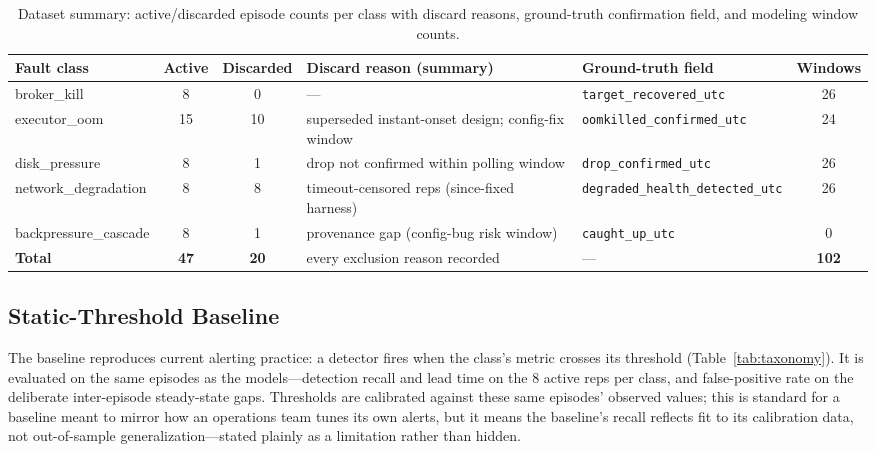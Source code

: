 \documentclass[conference]{IEEEtran}
\newcommand{\bk}{broker\_kill}
\newcommand{\eo}{executor\_oom}
\newcommand{\dpr}{disk\_pressure}
\newcommand{\nd}{network\_degradation}
\newcommand{\bc}{backpressure\_cascade}
\begin{document}
\begin{table}[!t]
\caption{Dataset summary: active/discarded episode counts per class with discard reasons, ground-truth confirmation field, and modeling window counts.}
\label{tab:dataset}
\centering
\footnotesize
\begin{tabular}{@{}lccllc@{}}
\toprule
\textbf{Fault class} & \textbf{Active} & \textbf{Discarded} & \textbf{Discard reason (summary)} & \textbf{Ground-truth field} & \textbf{Windows} \\
\midrule
\bk{}  & 8  & 0  & ---                                       & \texttt{target\_recovered\_utc}        & 26 \\
\eo{}  & 15 & 10 & superseded instant-onset design; config-fix window & \texttt{oomkilled\_confirmed\_utc} & 24 \\
\dpr{} & 8  & 1  & drop not confirmed within polling window   & \texttt{drop\_confirmed\_utc}          & 26 \\
\nd{}  & 8  & 8  & timeout-censored reps (since-fixed harness) & \texttt{degraded\_health\_detected\_utc} & 26 \\
\bc{}  & 8  & 1  & provenance gap (config-bug risk window)    & \texttt{caught\_up\_utc}               & 0 \\
\midrule
\textbf{Total} & \textbf{47} & \textbf{20} & every exclusion reason recorded & --- & \textbf{102} \\
\bottomrule
\end{tabular}
\end{table}

\subsection{Static-Threshold Baseline}
The baseline reproduces current alerting practice: a detector fires when the class's metric crosses its threshold (Table~\ref{tab:taxonomy}). It is evaluated on the same episodes as the models---detection recall and lead time on the 8 active reps per class, and false-positive rate on the deliberate inter-episode steady-state gaps. Thresholds are calibrated against these same episodes' observed values; this is standard for a baseline meant to mirror how an operations team tunes its own alerts, but it means the baseline's recall reflects fit to its calibration data, not out-of-sample generalization---stated plainly as a limitation rather than hidden.
\end{document}
